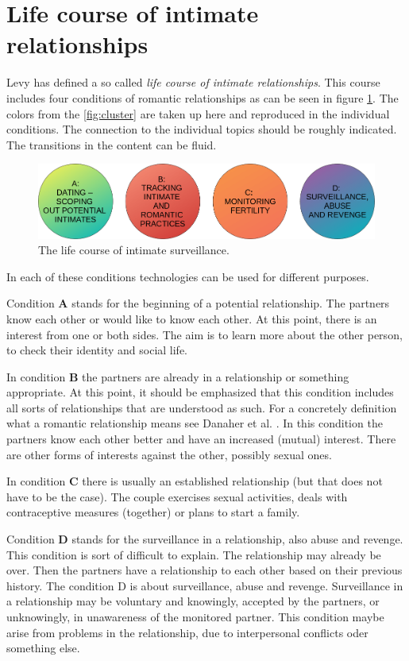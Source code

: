 \section{Life course of intimate relationships}
\label{sec:life_course}
Levy \cite{levy2014intimate} has defined a so called \textit{life course of intimate relationships}. This course includes four conditions of romantic relationships as can be seen in figure \ref{fig:live_course}. The colors from the \ref{fig:cluster} are taken up here and reproduced in the individual conditions. The connection to the individual topics should be roughly indicated. The transitions in the content can be fluid.
\begin{figure}[htb]
    \centering
	\includegraphics[width=\linewidth]{img/life_course_of_intimate_surveillance.png}
	\caption{The life course of intimate surveillance.}
	\label{fig:live_course}
\end{figure}

In each of these conditions technologies can be used for different purposes.

Condition \textbf{A} stands for the beginning of a potential relationship. The partners know each other or would like to know each other. At this point, there is an interest from one or both sides. The aim is to learn more about the other person, to check their identity and social life.

In condition \textbf{B} the partners are already in a relationship or something appropriate. At this point, it should be emphasized that this condition includes all sorts of relationships that are understood as such. For a concretely definition what a romantic relationship means see Danaher et al. \cite{doi:10.1080/15265161.2017.1409823}. In this condition the partners know each other better and have an increased (mutual) interest. There are other forms of interests against the other, possibly sexual ones.

In condition \textbf{C} there is usually an established relationship (but that does not have to be the case). The couple exercises sexual activities, deals with contraceptive measures (together) or plans to start a family.

Condition \textbf{D} stands for the surveillance in a relationship, also abuse and revenge. This condition is sort of difficult to explain. 
The relationship may already be over. Then the partners have a relationship to each other based on their previous history. The condition D is about surveillance, abuse and revenge. Surveillance in a relationship may be voluntary and knowingly, accepted by the partners, or unknowingly, in unawareness of the monitored partner.
This condition maybe arise from problems in the relationship, due to interpersonal conflicts oder something else.

